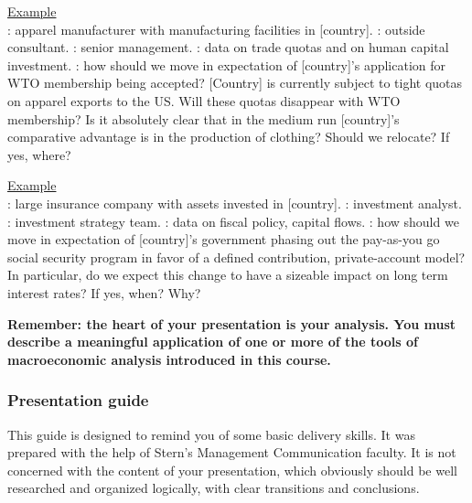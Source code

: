 \documentclass[letterpaper,12pt]{article}
\begin{document}
\begin{itemize}
\underline{Example} \\
: apparel manufacturer 
with manufacturing facilities in [country].
: outside consultant.
: senior management.
:  data on trade quotas and on human capital investment.
:  how should we move in expectation of [country]'s application for WTO membership being accepted?
[Country] is currently subject to tight quotas on apparel exports to
the US. Will these quotas disappear with WTO membership? Is it
absolutely clear that in the medium run [country]'s comparative
advantage is in the production of clothing? Should we relocate? If
yes, where?

\underline{Example}\\
:  large insurance company 
with assets invested in [country].
: investment analyst.
: investment strategy team.
:  data on fiscal policy, capital flows.
: how should we move in expectation of [country]'s
government phasing out the pay-as-you go social security program
in favor of a defined contribution, private-account model? In
particular, do we expect this change to have a sizeable impact on
long term interest rates? If yes, when? Why?  

\end{itemize}

{\bf Remember:  the heart of your presentation is your analysis.  You must describe a meaningful
application of one or more of the tools of macroeconomic analysis introduced in this course.}




\subsubsection*{Presentation guide}

This guide is designed to remind you of some basic delivery skills.
It was prepared with the help of Stern's 
Management Communication faculty.  
It is not concerned with the content of your presentation,
which obviously should be well researched and organized logically, with clear transitions and conclusions.
\end{document}
